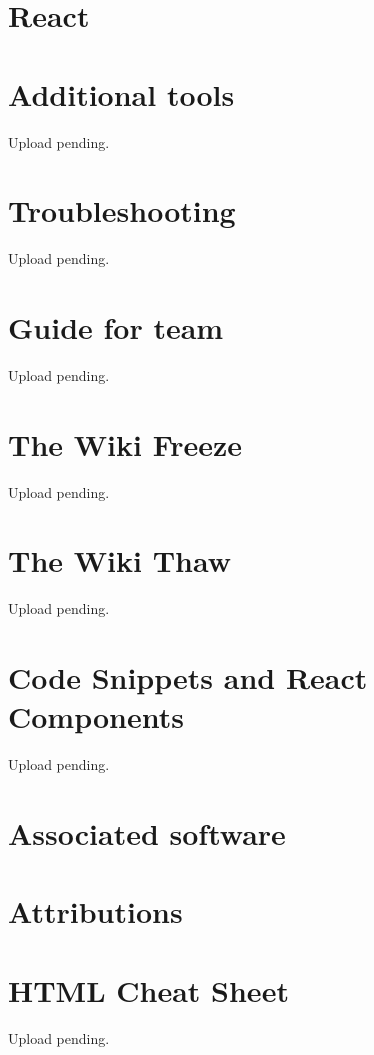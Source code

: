 \documentclass[a4paper, 11pt, twoside]{book}
\begin{document}
\chapter{React} \label{ch:react}


\newpage
%
\chapter{Additional tools} \label{ch:addtools}
Upload pending. %
%
\newpage
%
\chapter{Troubleshooting} \label{ch:troubleshooting}
Upload pending. %
%
\newpage
%
\chapter{Guide for team} \label{ch:guide}
Upload pending. %
%
\newpage
%
\chapter{The Wiki Freeze}  \label{ch:freeze}
Upload pending. %
%
\newpage
%
\chapter{The Wiki Thaw} \label{ch:thaw}
Upload pending. %
%
\newpage
%
\chapter{Code Snippets and React Components} \label{ch:appendix}
Upload pending. %
%
\newpage

\backmatter
{}
\pagecolor{pgcolor}

\chapter{Associated software} \label{ch:associated-software}


\chapter{Attributions} \label{ch:attributions}

%
\chapter{HTML Cheat Sheet} \label{ch:htmlcheatsheet}
Upload pending. %
%
\newpage
\end{document}
